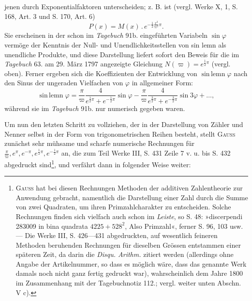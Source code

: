 jenen durch Exponentialfaktoren unterscheiden; z. B. ist (vergl. Werke X, 1,
S. 168, Art. 3 und S. 170, Art. 6)
\[
P(x)=M(x)\,.\,e^{-\frac12\frac{x^2}{\varpi^2}\pi}.
\]
\noindent Sie erscheinen in der schon im \textit{Tagebuch} 91b. eingeführten Variabeln \(\sin\varphi\)
vermöge der Kenntnis der Null- und Unendlichkeitsstellen von sin lemn als
 unendliche Produkte, und diese Darstellung liefert sofort den Beweis
für die im \textit{Tagebuch} 63. am 29. März 1797 angezeigte Gleichung \(N(\varpi)=e^{\frac12\pi}\)
(vergl. oben). Ferner ergeben sich die Koeffizienten der Entwicklung von
\(\operatorname{sin\,lemn}\varphi\) nach den Sinus der ungeraden Vielfachen von \(\varphi\) in allgemeiner Form:
\begingroup\makeatletter\tagsleft@true\let\veqno\leqno\makeatother
\begin{equation*}\tag*{(1)}
\operatorname{sin\,lemn}\varphi=\frac{\pi}{\varpi}\frac4{e^{\frac12\pi}+e^{-\frac12\pi}}\sin\varphi
-\frac{\pi}{\varpi}\frac4{e^{\frac32\pi}+e^{-\frac32\pi}}\sin3\varphi+\ldots,
\end{equation*}
\endgroup
\noindent während sie im \textit{Tagebuch} 91b. nur numerisch gegeben waren.

Um nun den letzten Schritt zu vollziehen, der in der Darstellung von
Zähler und Nenner selbst in der Form von trigonometrischen Reihen besteht,
stellt \textsc{Gauss} zunächst sehr mühsame und scharfe numerische Rechnungen für
\(\frac{\pi}{\varpi},e^\pi,e^{-\pi},e^{\frac12\pi},e^{-\frac12\pi}\) an, die zum Teil Werke III, S. 431 Zeile 7 v. u. bis
S. 432 abgedruckt sind\footnote{\textsc{Gauss} hat bei diesen Rechnungen Methoden der additiven Zahlentheorie zur Anwendung
gebracht, namentlich die Darstellung einer Zahl durch die Summe von zwei Quadraten, um ihren
Primzahlcharakter zu entscheiden. Solche Rechnungen finden sich vielfach auch schon im \textit{Leiste}, so S. 48:
»discerpendi 283009 in bina quadrata \(4225+528^2\), Also Primzahl«, ferner S. 96, 103 usw. — Die Werke
III, S. 426—431 abgedruckten, auf wesentlich feineren Methoden beruhenden Rechnungen für dieselben
Grössen entstammen einer späteren Zeit, da darin die \textit{Disqu. Arithm.} zitiert werden (allerdings ohne Angabe
der Artikelnummer, so dass es möglich wäre, dass das genannte Werk damals noch nicht ganz fertig
gedruckt war), wahrscheinlich dem Jahre 1800 im Zusammenhang mit der Tagebuchnotiz 112.; vergl. weiter
unten Abschn. V c).}, und verfährt dann in folgender Weise weiter:

